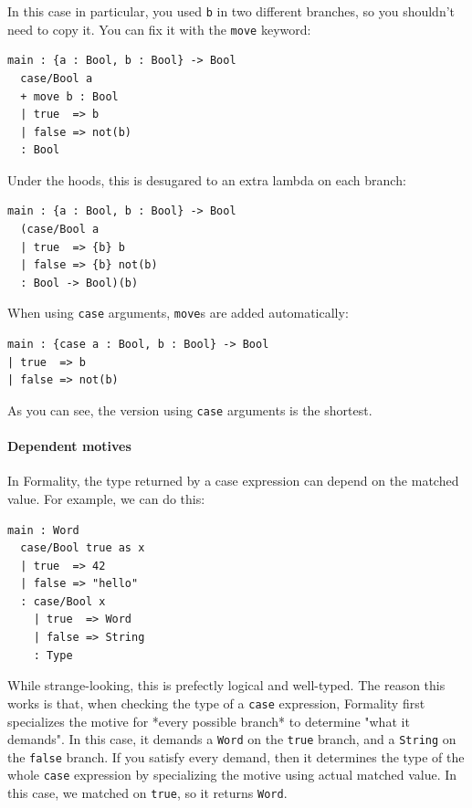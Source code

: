 \documentclass{article}
\theoremstyle{definition}
\theoremstyle{theorem}
\begin{document}
In this case in particular, you used \verb|b| in two different branches, so you
shouldn't need to copy it. You can fix it with the \verb|move| keyword:

\begin{lstlisting}
main : {a : Bool, b : Bool} -> Bool
  case/Bool a
  + move b : Bool
  | true  => b
  | false => not(b)
  : Bool
\end{lstlisting}

Under the hoods, this is desugared to an extra lambda on each branch:

\begin{lstlisting}
main : {a : Bool, b : Bool} -> Bool
  (case/Bool a
  | true  => {b} b
  | false => {b} not(b)
  : Bool -> Bool)(b)
\end{lstlisting}

When using \verb|case| arguments, \verb|move|s are added automatically:

\begin{lstlisting}
main : {case a : Bool, b : Bool} -> Bool
| true  => b
| false => not(b)
\end{lstlisting}

As you can see, the version using \verb|case| arguments is the shortest.

\paragraph{Dependent motives}

In Formality, the type returned by a case expression can depend on the matched
value. For example, we can do this:

\begin{lstlisting}
main : Word
  case/Bool true as x
  | true  => 42
  | false => "hello"
  : case/Bool x
    | true  => Word
    | false => String
    : Type
\end{lstlisting}

While strange-looking, this is prefectly logical and well-typed. The reason this
works is that, when checking the type of a \verb|case| expression, Formality
first specializes the motive for *every possible branch* to determine "what it
demands". In this case, it demands a \verb|Word| on the \verb|true| branch, and
a \verb|String| on the \verb|false| branch. If you satisfy every demand, then it
determines the type of the whole \verb|case| expression by specializing the
motive using actual matched value. In this case, we matched on \verb|true|, so
it returns \verb|Word|.
\end{document}
